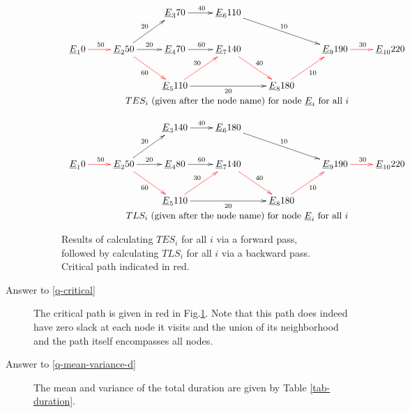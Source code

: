 \begin{description}
\begin{figure}[h!]
\centering
$$
\begin{array}{c}
\xymatrix{
&&\rvE_3\ar[r]^{40}70
&\rvE_6\ar[drr]^{10}110
\\
\rvE_1\ar@[red][r]^{50}0
&\rvE_2\ar[ru]^{20}\ar@[red][rd]_{60}\ar[r]^{20}50
&\rvE_4\ar[r]^{60}70
&\rvE_7\ar@[red][rd]^{40}140
&&\rvE_9\ar@[red][r]^{30}190
&\rvE_{10}220
\\
&&\rvE_5\ar@[red][ru]^{30}\ar[rr]_{20}110
&&\rvE_8\ar@[red][ru]_{10}180
}
\\
TES_i \text{ (given after the node name) for node $\rvE_i$ for all $i$}
\\
\\
\xymatrix{
&&\rvE_3\ar[r]^{40}140
&\rvE_6\ar[drr]^{10}180
\\
\rvE_1\ar@[red][r]^{50}0
&\rvE_2\ar[ru]^{20}\ar@[red][rd]_{60}\ar[r]^{20}50
&\rvE_4\ar[r]^{60}80
&\rvE_7\ar@[red][rd]^{40}140
&&\rvE_9\ar@[red][r]^{30}190
&\rvE_{10}220
\\
&&\rvE_5\ar@[red][ru]^{30}\ar[rr]_{20}110
&&\rvE_8\ar@[red][ru]_{10}180
}
\\
TLS_i \text{ (given after the node name) for node $\rvE_i$ for all $i$}
\end{array}
$$
\caption{Results of calculating
$TES_i$  for all $i$ via a forward
pass, followed by calculating
$TLS_i$ for all $i$
via a backward pass.
Critical path indicated in red.}
\label{fig-pert-times}
\end{figure}

\item[Answer to \ref{q-critical}]
The critical path is given 
in red in Fig.\ref{fig-pert-times}.
Note that this path does indeed
have zero slack at each node it
visits and the union of
its neighborhood and 
the path itself encompasses all nodes.
\item[Answer to \ref{q-mean-variance-d}]

The mean
and variance of
the total duration
are given by Table \ref{tab-duration}.


\end{description}
